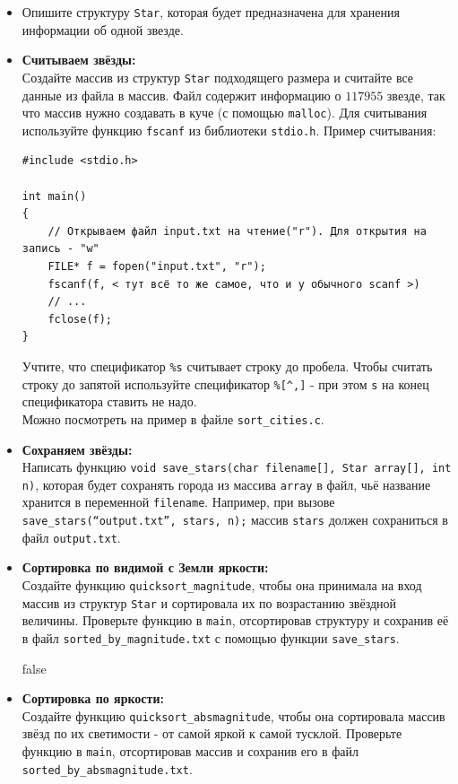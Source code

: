 \documentclass{article}
\begin{document}
\begin{itemize}
\item Опишите структуру \texttt{Star}, которая будет предназначена для хранения информации об одной звезде.
\item \textbf{Считываем звёзды:}\\ Создайте массив из структур \texttt{Star} подходящего размера и считайте все данные из файла в массив. Файл содержит информацию о $117955$ звезде, так что массив нужно создавать в куче (с помощью \texttt{malloc}). Для считывания используйте функцию \texttt{fscanf} из библиотеки \texttt{stdio.h}. Пример считывания:
\begin{lstlisting}
#include <stdio.h>

int main()
{
    // Открываем файл input.txt на чтение("r"). Для открытия на запись - "w"
    FILE* f = fopen("input.txt", "r");
    fscanf(f, < тут всё то же самое, что и у обычного scanf >)
    // ...
    fclose(f);
}
\end{lstlisting}
Учтите, что спецификатор \texttt{\%s} считывает строку до пробела. Чтобы считать строку до запятой используйте спецификатор \texttt{\%[\textasciicircum,]} - при этом \texttt{s} на конец спецификатора ставить не надо.\\
Можно посмотреть на пример в файле \texttt{sort\_cities.c}.

\item \textbf{Сохраняем звёзды:}\\ Написать функцию \texttt{void save\_stars(char filename[], Star array[], int n)}, которая будет сохранять города из массива \texttt{array} в файл, чьё название хранится в переменной \texttt{filename}. Например, при вызове \texttt{save\_stars(``output.txt'', stars, n);} массив \texttt{stars} должен сохраниться в файл \texttt{output.txt}.

\item \textbf{Сортировка по видимой с Земли яркости:}\\ Создайте функцию \texttt{quicksort\_magnitude}, чтобы она принимала на вход массив из структур \texttt{Star} и сортировала их по возрастанию звёздной величины. Проверьте функцию в \texttt{main}, отсортировав структуру и сохранив её в файл \texttt{sorted\_by\_magnitude.txt} с помощью функции \texttt{save\_stars}.

\if false
\item \textbf{Сортировка по яркости:}\\ Создайте функцию \texttt{quicksort\_absmagnitude}, чтобы она сортировала массив звёзд по их светимости - от самой яркой к самой тусклой. Проверьте функцию в \texttt{main}, отсортировав массив и сохранив его в файл \texttt{sorted\_by\_absmagnitude.txt}.
\fi


\end{itemize}
\end{document}
